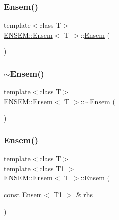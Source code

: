\subsubsection{\texorpdfstring{Ensem()}{Ensem()}\hspace{0.1cm}{\footnotesize\ttfamily [7/9]}}
{\footnotesize\ttfamily template$<$class T$>$ \\
\mbox{\hyperlink{classENSEM_1_1Ensem}{E\+N\+S\+E\+M\+::\+Ensem}}$<$ T $>$\+::\mbox{\hyperlink{classENSEM_1_1Ensem}{Ensem}} (\begin{DoxyParamCaption}{ }\end{DoxyParamCaption})\hspace{0.3cm}{\ttfamily [inline]}}

\mbox{\label{classENSEM_1_1Ensem_a01e4e19b101048ad2ffcf886017592c9}} 
\subsubsection{\texorpdfstring{$\sim$Ensem()}{~Ensem()}\hspace{0.1cm}{\footnotesize\ttfamily [3/3]}}
{\footnotesize\ttfamily template$<$class T$>$ \\
\mbox{\hyperlink{classENSEM_1_1Ensem}{E\+N\+S\+E\+M\+::\+Ensem}}$<$ T $>$\+::$\sim$\mbox{\hyperlink{classENSEM_1_1Ensem}{Ensem}} (\begin{DoxyParamCaption}{ }\end{DoxyParamCaption})\hspace{0.3cm}{\ttfamily [inline]}}

\mbox{\label{classENSEM_1_1Ensem_ab0e04ebf09af997fb7f1477cdc48145b}} 
\subsubsection{\texorpdfstring{Ensem()}{Ensem()}\hspace{0.1cm}{\footnotesize\ttfamily [8/9]}}
{\footnotesize\ttfamily template$<$class T$>$ \\
template$<$class T1 $>$ \\
\mbox{\hyperlink{classENSEM_1_1Ensem}{E\+N\+S\+E\+M\+::\+Ensem}}$<$ T $>$\+::\mbox{\hyperlink{classENSEM_1_1Ensem}{Ensem}} (\begin{DoxyParamCaption}\item[{const \mbox{\hyperlink{classENSEM_1_1Ensem}{Ensem}}$<$ T1 $>$ \&}]{rhs }\end{DoxyParamCaption})\hspace{0.3cm}{\ttfamily [inline]}}



